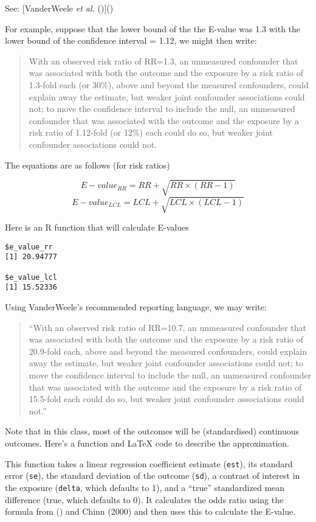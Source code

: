 \documentclass[
  singlecolumn]{article}
\begin{document}
See: {[}VanderWeele \emph{et al.}
(){]}()

For example, suppose that the lower bound of the the E-value was 1.3
with the lower bound of the confidence interval = 1.12, we might then
write:

\begin{quote}
With an observed risk ratio of RR=1.3, an unmeasured confounder that was
associated with both the outcome and the exposure by a risk ratio of
1.3-fold each (or 30\%), above and beyond the measured confounders,
could explain away the estimate, but weaker joint confounder
associations could not; to move the confidence interval to include the
null, an unmeasured confounder that was associated with the outcome and
the exposure by a risk ratio of 1.12-fold (or 12\%) each could do so,
but weaker joint confounder associations could not.
\end{quote}

The equations are as follows (for risk ratios)

\[
E-value_{RR} = RR + \sqrt{RR \times (RR - 1)}
\] \[
E-value_{LCL} = LCL + \sqrt{LCL \times (LCL - 1)}
\]

Here is an R function that will calculate E-values

\begin{verbatim}
$e_value_rr
[1] 20.94777

$e_value_lcl
[1] 15.52336
\end{verbatim}

Using VanderWeele's recommended reporting language, we may write:

\begin{quote}
``With an observed risk ratio of RR=10.7, an unmeasured confounder that
was associated with both the outcome and the exposure by a risk ratio of
20.9-fold each, above and beyond the measured confounders, could explain
away the estimate, but weaker joint confounder associations could not;
to move the confidence interval to include the null, an unmeasured
confounder that was associated with the outcome and the exposure by a
risk ratio of 15.5-fold each could do so, but weaker joint confounder
associations could not.''
\end{quote}

Note that in this class, most of the outcomes will be (standardised)
continuous outcomes. Here's a function and LaTeX code to describe the
approximation.

This function takes a linear regression coefficient estimate
(\texttt{est}), its standard error (\texttt{se}), the standard deviation
of the outcome (\texttt{sd}), a contrast of interest in the exposure
(\texttt{delta}, which defaults to 1), and a ``true'' standardized mean
difference (true, which defaults to 0). It calculates the odds ratio
using the formula from () and Chinn (2000) and then uses this to calculate the
E-value.
\end{document}
